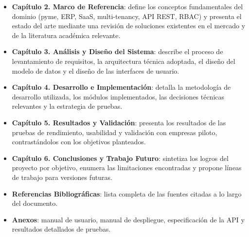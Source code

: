 \begin{itemize}
\tightlist
\item
  \textbf{Capítulo 2. Marco de Referencia}: define los conceptos fundamentales del dominio (pyme, ERP, SaaS, multi-tenancy, API REST, RBAC) y presenta el estado del arte mediante una revisión de soluciones existentes en el mercado y de la literatura académica relevante.
\item
  \textbf{Capítulo 3. Análisis y Diseño del Sistema}: describe el proceso de levantamiento de requisitos, la arquitectura técnica adoptada, el diseño del modelo de datos y el diseño de las interfaces de usuario.
\item
  \textbf{Capítulo 4. Desarrollo e Implementación}: detalla la metodología de desarrollo utilizada, los módulos implementados, las decisiones técnicas relevantes y la estrategia de pruebas.
\item
  \textbf{Capítulo 5. Resultados y Validación}: presenta los resultados de las pruebas de rendimiento, usabilidad y validación con empresas piloto, contrastándolos con los objetivos planteados.
\item
  \textbf{Capítulo 6. Conclusiones y Trabajo Futuro}: sintetiza los logros del proyecto por objetivo, enumera las limitaciones encontradas y propone líneas de trabajo para versiones futuras.
\item
  \textbf{Referencias Bibliográficas}: lista completa de las fuentes citadas a lo largo del documento.
\item
  \textbf{Anexos}: manual de usuario, manual de despliegue, especificación de la API y resultados detallados de pruebas.
\end{itemize}
